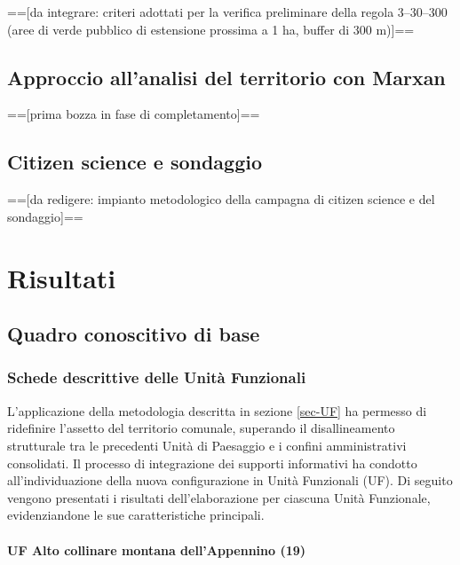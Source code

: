 \documentclass[
  a4paper,
]{book}
\begin{document}
=={[}da integrare: criteri adottati per la verifica preliminare della regola 3--30--300 (aree di verde pubblico di estensione prossima a 1 ha, buffer di 300 m){]}==

\section{Approccio all'analisi del territorio con Marxan}\label{approccio-allanalisi-del-territorio-con-marxan}

=={[}prima bozza in fase di completamento{]}==

\section{Citizen science e sondaggio}\label{citizen-science-e-sondaggio}

=={[}da redigere: impianto metodologico della campagna di citizen science e del sondaggio{]}==

\chapter{Risultati}\label{risultati}

\section{Quadro conoscitivo di base}\label{quadro-conoscitivo-di-base}

\subsection{Schede descrittive delle Unità Funzionali}\label{schede-descrittive-delle-unituxe0-funzionali}

L'applicazione della metodologia descritta in sezione \ref{sec-UF} ha permesso di ridefinire l'assetto del territorio comunale, superando il disallineamento strutturale tra le precedenti Unità di Paesaggio e i confini amministrativi consolidati.
Il processo di integrazione dei supporti informativi ha condotto all'individuazione della nuova configurazione in Unità Funzionali (UF).
Di seguito vengono presentati i risultati dell'elaborazione per ciascuna Unità Funzionale, evidenziandone le sue caratteristiche principali.

\subsubsection{UF Alto collinare montana dell'Appennino (19)}\label{uf-alto-collinare-montana-dellappennino-19}
\end{document}
